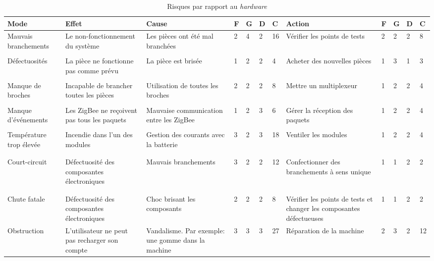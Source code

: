 \begin{table}[h]
	\centering
	\caption{Risques par rapport au \emph{hardware}}
	\begin{tabular}{P{2cm}P{2cm}P{2cm}llllP{2cm}llll}
		\hline
		\bf Mode & \bf Effet & \bf Cause & \bf F & \bf G & \bf D & \bf C & \bf Action & \bf F & \bf G & \bf D & \bf C  \\
		\hline
		\hline
		Mauvais branchements & Le non-fonctionnement du système & Les pièces ont été mal branchées & 2 & 4 & 2 & 16 & Vérifier les points de tests & 2 & 2 & 2 & 8 \\\\
		Défectuosités & La pièce ne fonctionne pas comme prévu & La pièce est brisée & 1 & 2 & 2 & 4 &	Acheter des nouvelles pièces & 1 & 3 & 1 & 3 \\\\
		Manque de broches & Incapable de brancher toutes les pièces & Utilisation de toutes les broches & 2 & 2 & 2 & 8 & Mettre un multiplexeur & 1 & 2 & 2 & 4 \\\\
        Manque d'événements & Les ZigBee ne reçoivent pas tous les paquets & Mauvaise communication entre les ZigBee & 1 & 2 & 3 & 6 & Gérer la réception des paquets & 1 & 2 & 2 & 4 \\\\
        Température trop élevée & Incendie dans l'un des modules & Gestion des courants avec la batterie & 3 & 2 & 3 & 18 & Ventiler les modules & 1 & 2 & 2 & 4 \\
        \\\\
        Court-circuit & Défectuosité des composantes électroniques & Mauvais branchements & 3 & 2 & 2 & 12 & Confectionner des branchements à sens unique & 1 & 1 & 2 & 2 \\
        \\\\
        Chute fatale & Défectuosité des composantes électroniques & Choc brisant les composants & 2 & 2 & 2 & 8 & Vérifier les points de tests et changer les composantes défectueuses & 1 & 1 & 2 & 2 \\
        Obstruction & L'utilisateur ne peut pas recharger son compte & Vandalisme. Par exemple: une gomme dans la machine  & 3 & 3 & 3 & 27 & Réparation de la machine & 2 & 3 & 2 & 12 \\
		\hline
	\end{tabular}
\end{table}

